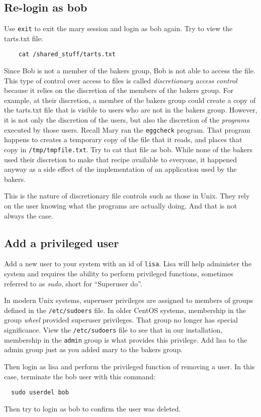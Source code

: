 \subsection{Re-login as bob}
Use {\tt exit} to exit the mary session and login as bob again.  Try to view the tarts.txt file:
\begin{verbatim}
    cat /shared_stuff/tarts.txt
\end{verbatim}
\noindent Since Bob is not a member of the bakers group, Bob is not able to access the file.  This type
of control over access to files is called \textit{discretionary access control} because it relies on
the discretion of the members of the bakers group.  For example, at their discretion, a member of
the bakers group could create a copy
of the tarts.txt file that is visible to users who are not in the bakers group.  However, it is not only the discretion
of the users, but also the discretion of the \textit{programs} executed by those users.  Recall Mary ran the
{\tt eggcheck} program.  That program happens to creates a temporary copy of the file that it reads, and places that
copy in {\tt /tmp/tmpfile.txt}.  Try to cat that file as bob.  While none of the bakers used their discretion to make
that recipe available to everyone, it happened anyway as a side effect of the implementation of an application used by
the bakers.

This is the nature of discretionary file controls such as those in Unix.  They rely on the user knowing what the
programs are actually doing.  And that is not always the case.

\subsection{Add a privileged user}
Add a new user to your system with an id of {\tt lisa}.  Lisa will help administer the system and requires
the ability to perform privileged functions, sometimes referred to as \textit{sudo}, short for ``Superuser do''. 

In modern Unix systems, superuser privileges are assigned to members of groups defined in the {\tt /etc/sudoers} file.
In older CentOS systems, membership in the group \textit{wheel} provided superuser privileges.  That group no longer
has special significance.  View the {\tt /etc/sudoers} file to see that in our installation, membership in the {\tt admin} group
is what provides this privilege.  Add lisa to the admin group just as you added mary to the bakers group.

Then login as lisa and perform the privileged function of removing a user.  In this case, terminate the bob user
with this command:
\begin{verbatim}
  sudo userdel bob
\end{verbatim}
\noindent Then try to login as bob to confirm the user was deleted.
